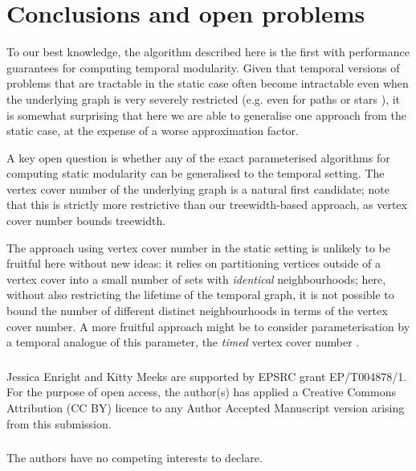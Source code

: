 \documentclass[runningheads]{llncs}
\begin{document}
\section{Conclusions and open problems}\label{sec:conclusion}

To our best knowledge, the algorithm described here is the first with performance guarantees for computing temporal modularity.  Given that temporal versions of problems that are tractable in the static case often become intractable even when the underlying graph is very severely restricted (e.g. even for paths \cite{mertziosMatchings23} or stars \cite{akridaStarExp21}), it is somewhat surprising that here we are able to generalise one approach from the static case, at the expense of a worse approximation factor.

A key open question is whether any of the exact parameterised algorithms for computing static modularity can be generalised to the temporal setting.  The vertex cover number of the underlying graph is a natural first candidate; note that this is strictly more restrictive than our treewidth-based approach, as vertex cover number bounds treewidth. 

The approach using vertex cover number in the static setting \cite{w1hard} is unlikely to be fruitful here without new ideas: it relies on partitioning vertices outside of a vertex cover into a small number of sets with \emph{identical} neighbourhoods; here, without also restricting the lifetime of the temporal graph, it is not possible to bound the number of different distinct neighbourhoods in terms of the vertex cover number.  A more fruitful approach might be to consider parameterisation by a temporal analogue of this parameter, the \emph{timed} vertex cover number \cite{casteigtsWaiting21}.

\begin{credits}
\subsubsection{\ackname}
 Jessica Enright and Kitty Meeks are supported by EPSRC grant EP/T004878/1. For the purpose of open access, the author(s) has applied a Creative Commons Attribution (CC BY) licence to any Author Accepted Manuscript version arising from this submission. 

\subsubsection{\discintname}
The authors have no competing interests to declare. 
\end{credits}

\newpage

{
%
%
%


}
\end{document}
